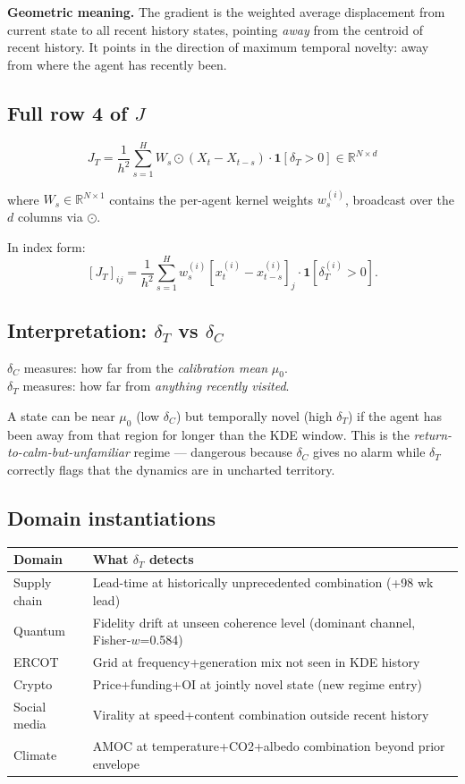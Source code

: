 \documentclass[11pt,a4paper]{article}
\theoremstyle{definition}
\newcommand{\R}{\mathbb{R}}
\begin{document}
\textbf{Geometric meaning.}
The gradient is the weighted average displacement from current state to all recent history states,
pointing \emph{away} from the centroid of recent history.
It points in the direction of maximum temporal novelty:
away from where the agent has recently been.

\subsection{Full row 4 of $J$}

\[
J_T = \frac{1}{h^2}\sum_{s=1}^H W_s \odot (X_t - X_{t-s}) \cdot \mathbf{1}[\delta_T > 0] \in \R^{N\times d}
\]

where $W_s \in \R^{N\times 1}$ contains the per-agent kernel weights $w_s^{(i)}$,
broadcast over the $d$ columns via $\odot$.

In index form:
\[
[J_T]_{ij} = \frac{1}{h^2}\sum_{s=1}^H w_s^{(i)}\left[x_t^{(i)}-x_{t-s}^{(i)}\right]_j \cdot \mathbf{1}[\delta_T^{(i)}>0].
\]

\subsection{Interpretation: $\delta_T$ vs $\delta_C$}

$\delta_C$ measures: how far from the \emph{calibration mean} $\mu_0$.\\
$\delta_T$ measures: how far from \emph{anything recently visited}.

A state can be near $\mu_0$ (low $\delta_C$) but temporally novel (high $\delta_T$)
if the agent has been away from that region for longer than the KDE window.
This is the \emph{return-to-calm-but-unfamiliar} regime — dangerous because
$\delta_C$ gives no alarm while $\delta_T$ correctly flags that the dynamics are in uncharted territory.

\subsection{Domain instantiations}

\begin{center}
\begin{tabular}{ll}
\toprule
Domain & What $\delta_T$ detects \\
\midrule
Supply chain & Lead-time at historically unprecedented combination (+98 wk lead) \\
Quantum & Fidelity drift at unseen coherence level (dominant channel, Fisher-$w$=0.584) \\
ERCOT & Grid at frequency+generation mix not seen in KDE history \\
Crypto & Price+funding+OI at jointly novel state (new regime entry) \\
Social media & Virality at speed+content combination outside recent history \\
Climate & AMOC at temperature+CO2+albedo combination beyond prior envelope \\
\bottomrule
\end{tabular}
\end{center}
\end{document}
